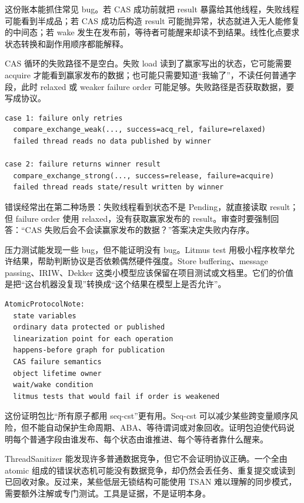 这份账本能抓住常见 bug。若 CAS 成功前就把 result 暴露给其他线程，失败线程可能看到半成品；若 CAS 成功后构造 result 可能抛异常，状态就进入无人能修复的中间态；若 wake 发生在发布前，等待者可能醒来却读不到结果。线性化点要求状态转换和副作用顺序都能解释。

CAS 循环的失败路径不是空白。失败 load 读到了赢家写出的状态，它可能需要 acquire 才能看到赢家发布的数据；也可能只需要知道“我输了”，不读任何普通字段，此时 relaxed 或 weaker failure order 可能足够。失败路径是否获取数据，要写成协议。

\begin{lstlisting}[numbers=none,caption={CAS 失败路径的两种语义}]
case 1: failure only retries
  compare_exchange_weak(..., success=acq_rel, failure=relaxed)
  failed thread reads no data published by winner

case 2: failure returns winner result
  compare_exchange_strong(..., success=release, failure=acquire)
  failed thread reads state/result written by winner
\end{lstlisting}

错误经常出在第二种场景：失败线程看到状态不是 Pending，就直接读取 result；但 failure order 使用 relaxed，没有获取赢家发布的 result。审查时要强制回答：“CAS 失败后会不会读赢家发布的数据？”答案决定失败内存序。

压力测试能发现一些 bug，但不能证明没有 bug。Litmus test 用极小程序枚举允许结果，帮助判断协议是否依赖偶然硬件强度。Store buffering、message passing、IRIW、Dekker 这类小模型应该保留在项目测试或文档里。它们的价值是把“这台机器没复现”转换成“这个结果在模型上是否允许”。

\begin{lstlisting}[numbers=none,caption={并发协议审查的最小证明包}]
AtomicProtocolNote:
  state variables
  ordinary data protected or published
  linearization point for each operation
  happens-before graph for publication
  CAS failure semantics
  object lifetime owner
  wait/wake condition
  litmus tests that would fail if order is weakened
\end{lstlisting}

这份证明包比“所有原子都用 seq-cst”更有用。Seq-cst 可以减少某些跨变量顺序风险，但不能自动保护生命周期、ABA、等待谓词或对象回收。证明包迫使代码说明每个普通字段由谁发布、每个状态由谁推进、每个等待者靠什么醒来。

ThreadSanitizer 能发现许多普通数据竞争，但它不会证明协议正确。一个全由 atomic 组成的错误状态机可能没有数据竞争，却仍然会丢任务、重复提交或读到已回收对象。反过来，某些低层无锁结构可能使用 TSAN 难以理解的同步模式，需要额外注解或专门测试。工具是证据，不是证明本身。

